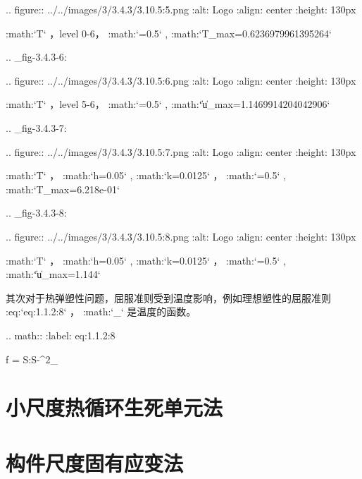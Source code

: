 .. figure:: ../../images/3/3.4.3/3.10.5:5.png
   :alt: Logo
   :align: center
   :height: 130px
	    
   :math:`T` ，level 0-6， :math:`=0.5` , :math:`T_{max}=0.6236979961395264`

.. _fig-3.4.3-6:

.. figure:: ../../images/3/3.4.3/3.10.5:6.png
   :alt: Logo
   :align: center
   :height: 130px

   :math:`T` ，level 5-6， :math:`=0.5` , :math:`\|\mathbf u\|_{max}=1.1469914204042906`

.. _fig-3.4.3-7:

.. figure:: ../../images/3/3.4.3/3.10.5:7.png
   :alt: Logo
   :align: center
   :height: 130px

   :math:`T` ， :math:`h=0.05` , :math:`k=0.0125` ， :math:`=0.5` , :math:`T_{max}=6.218\mathrm e-01`
	   
.. _fig-3.4.3-8:

.. figure:: ../../images/3/3.4.3/3.10.5:8.png
   :alt: Logo
   :align: center
   :height: 130px

   :math:`T` ， :math:`h=0.05` , :math:`k=0.0125` ， :math:`=0.5` , :math:`\|\mathbf u\|_{max}=1.144`

其次对于热弹塑性问题，屈服准则受到温度影响，例如理想塑性的屈服准则 :eq:`eq:1.1.2:8` ， :math:`\sigma_\theta` 是温度的函数。

.. math::
   :label: eq:1.1.2:8
	   
   f = \mathbf S:\mathbf S-\sigma^2_\theta
\fi
\section{小尺度热循环生死单元法}

\section{构件尺度固有应变法}
